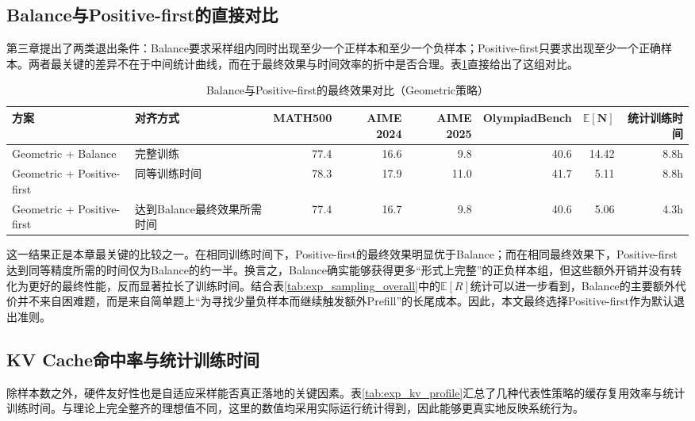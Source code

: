 \subsection{Balance与Positive-first的直接对比}
\label{subsec:exp_balance_vs_pf}

第三章提出了两类退出条件：Balance要求采样组内同时出现至少一个正样本和至少一个负样本；Positive-first只要求出现至少一个正确样本。两者最关键的差异不在于中间统计曲线，而在于最终效果与时间效率的折中是否合理。表\ref{tab:exp_balance_pf_table}直接给出了这组对比。

\begin{table}[htbp]
    \centering
    \caption{Balance与Positive-first的最终效果对比（Geometric策略）}\label{tab:exp_balance_pf_table}
    \small
    \setlength{\tabcolsep}{3.2pt}
    \renewcommand{\arraystretch}{1.15}
    \begin{tabular}{|l|l|r|r|r|r|r|r|}
    \hline
    \textbf{方案} & \textbf{对齐方式} & \textbf{MATH500} & \textbf{AIME 2024} & \textbf{AIME 2025} & \textbf{OlympiadBench} & $\boldsymbol{\mathbb{E}[N]}$ & \textbf{统计训练时间} \\
    \hline
    Geometric + Balance        & 完整训练                 & 77.4 & 16.6 & 9.8  & 40.6 & 14.42 & 8.8h \\
    Geometric + Positive-first & 同等训练时间             & 78.3 & 17.9 & 11.0 & 41.7 & 5.11  & 8.8h \\
    Geometric + Positive-first & 达到Balance最终效果所需时间 & 77.4 & 16.7 & 9.8  & 40.6 & 5.06  & 4.3h \\
    \hline
    \end{tabular}
\end{table}

这一结果正是本章最关键的比较之一。在相同训练时间下，Positive-first的最终效果明显优于Balance；而在相同最终效果下，Positive-first达到同等精度所需的时间仅为Balance的约一半。换言之，Balance确实能够获得更多“形式上完整”的正负样本组，但这些额外开销并没有转化为更好的最终性能，反而显著拉长了训练时间。结合表\ref{tab:exp_sampling_overall}中的$\mathbb{E}[R]$统计可以进一步看到，Balance的主要额外代价并不来自困难题，而是来自简单题上“为寻找少量负样本而继续触发额外Prefill”的长尾成本。因此，本文最终选择Positive-first作为默认退出准则。

\subsection{KV Cache命中率与统计训练时间}
\label{subsec:exp_kv_time}

除样本数之外，硬件友好性也是自适应采样能否真正落地的关键因素。表\ref{tab:exp_kv_profile}汇总了几种代表性策略的缓存复用效率与统计训练时间。与理论上完全整齐的理想值不同，这里的数值均采用实际运行统计得到，因此能够更真实地反映系统行为。

